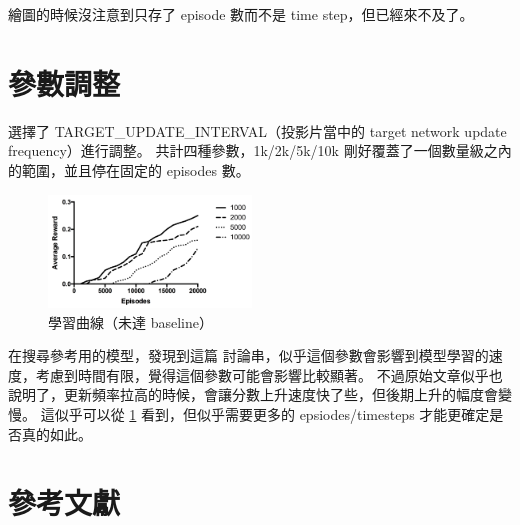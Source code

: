 \documentclass[final,3p]{elsarticle}
\begin{document}
	繪圖的時候沒注意到只存了 episode 數而不是 time step，但已經來不及了。
		
\section{參數調整}
	選擇了 TARGET\_UPDATE\_INTERVAL（投影片當中的 target network update frequency）進行調整。
	共計四種參數，1k/2k/5k/10k 剛好覆蓋了一個數量級之內的範圍，並且停在固定的 episodes 數。
	
	\begin{figure}[H]
		\centering
		\includegraphics[width=0.48\textwidth]{images/dqn_update}
		\caption{學習曲線（未達 baseline）} \label{fig:dqn_update}
	\end{figure}
	
	在搜尋參考用的模型，發現到這篇 \cite{Thetests90:online} 討論串，似乎這個參數會影響到模型學習的速度，考慮到時間有限，覺得這個參數可能會影響比較顯著。
	不過原始文章似乎也說明了，更新頻率拉高的時候，會讓分數上升速度快了些，但後期上升的幅度會變慢。
	這似乎可以從 \cref{fig:dqn_update} 看到，但似乎需要更多的 epsiodes/timesteps 才能更確定是否真的如此。
		


%  
% 
% 
% 
% 
% 
% 
% 
% 
% 
% 
% 
% 

\section{參考文獻}


	
\end{document}
